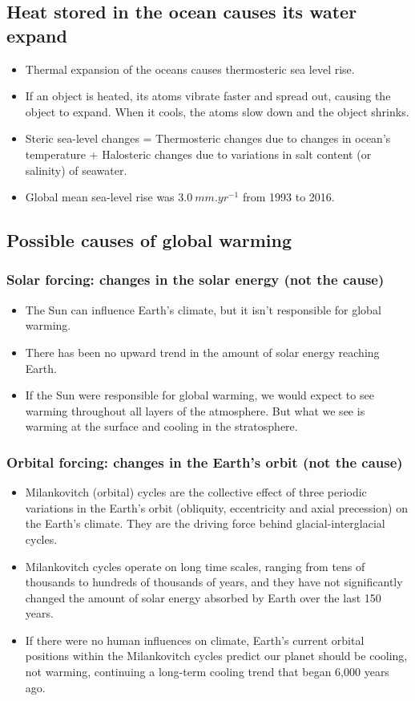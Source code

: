\documentclass[11pt]{article}
\begin{document}
\subsection{Heat stored in the ocean causes its water expand}
\label{sec:org5e30dfe}
\begin{itemize}
\item Thermal expansion of the oceans causes thermosteric sea level rise.
\item If an object is heated, its atoms vibrate faster and spread out, causing the object to expand. When it cools, the atoms slow down and the object shrinks.
\item Steric sea-level changes = Thermosteric changes due to changes in ocean's temperature + Halosteric changes due to variations in salt content (or salinity) of seawater.
\item Global mean sea-level rise was \(\qty{3.0}{mm.yr^{-1}}\) from 1993 to 2016.
\end{itemize}
\subsection{Possible causes of global warming}
\label{sec:org006013f}

\subsubsection{Solar forcing: changes in the solar energy (not the cause)}
\label{sec:orgc8bd410}
\begin{itemize}
\item The Sun can influence Earth's climate, but it isn't responsible for global warming.
\item There has been no upward trend in the amount of solar energy reaching Earth.
\item If the Sun were responsible for global warming, we would expect to see warming throughout all layers of the atmosphere. But what we see is warming at the surface and cooling in the stratosphere.
\end{itemize}
\subsubsection{Orbital forcing: changes in the Earth's orbit (not the cause)}
\label{sec:orgc91d6a2}
\begin{itemize}
\item Milankovitch (orbital) cycles are the collective effect of three periodic variations in the Earth's orbit (obliquity, eccentricity and axial precession) on the Earth's climate. They are the driving force behind glacial-interglacial cycles.
\item Milankovitch cycles operate on long time scales, ranging from tens of thousands to hundreds of thousands of years, and they have not significantly changed the amount of solar energy absorbed by Earth over the last 150 years.
\item If there were no human influences on climate, Earth's current orbital positions within the Milankovitch cycles predict our planet should be cooling, not warming, continuing a long-term cooling trend that began 6,000 years ago.
\end{itemize}
\end{document}
